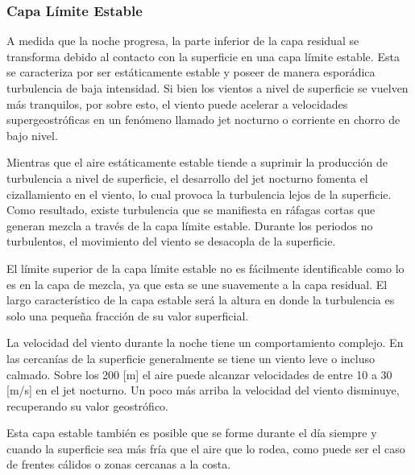 \subsubsection{Capa Límite Estable}
A medida que la noche progresa, la parte inferior de la capa residual se transforma debido al contacto con la superficie en una capa límite estable. Esta se caracteriza por ser estáticamente estable y poseer de manera esporádica turbulencia de baja intensidad. Si bien los vientos a nivel de superficie se vuelven más tranquilos, por sobre esto, el viento puede acelerar a velocidades supergeostróficas en un fenómeno llamado jet nocturno o corriente en chorro de bajo nivel.

Mientras que el aire estáticamente estable tiende a suprimir la producción de turbulencia a nivel de superficie, el desarrollo del jet nocturno fomenta el cizallamiento en el viento, lo cual provoca la turbulencia lejos de la superficie. Como resultado, existe turbulencia que se manifiesta en ráfagas cortas que generan mezcla a través de la capa límite estable. Durante los periodos no turbulentos, el movimiento del viento se desacopla de la superficie.

El límite superior de la capa límite estable no es fácilmente identificable como lo es en la capa de mezcla, ya que esta se une suavemente a la capa residual. El largo característico de la capa estable será la altura en donde la turbulencia es solo una pequeña fracción de su valor superficial.

La velocidad del viento durante la noche tiene un comportamiento complejo. En las cercanías de la superficie generalmente se tiene un viento leve o incluso calmado. Sobre los 200 [m] el aire puede alcanzar velocidades de entre 10 a 30 [m/s] en el jet nocturno. Un poco más arriba la velocidad del viento disminuye, recuperando su valor geostrófico.

Esta capa estable también es posible que se forme durante el día siempre y cuando la superficie sea más fría que el aire que lo rodea, como puede ser el caso de frentes cálidos o zonas cercanas a la costa.
